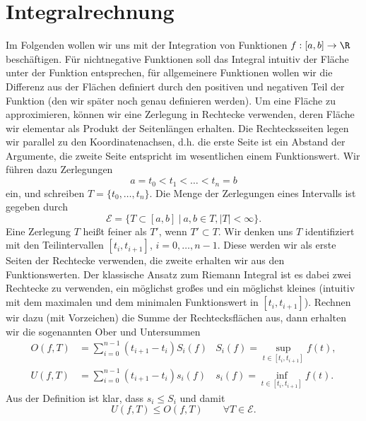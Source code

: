 \documentclass[letterpaper,10pt,english]{jupyterBook}
\begin{document}
\chapter{Integralrechnung}
\label{\detokenize{integration/integration:integralrechnung}}\label{\detokenize{integration/integration::doc}}
Im Folgenden wollen wir uns mit der Integration von Funktionen \(f:[a,b] \rightarrow \R\) beschäftigen. Für nichtnegative Funktionen soll das Integral intuitiv der Fläche unter der Funktion entsprechen, für allgemeinere Funktionen wollen wir die Differenz aus der Flächen definiert durch den positiven und negativen Teil der Funktion (den wir später noch genau definieren werden).  Um eine Fläche zu approximieren, können wir eine Zerlegung in Rechtecke verwenden, deren Fläche wir elementar als Produkt der Seitenlängen erhalten. Die Rechtecksseiten legen wir parallel zu den Koordinatenachsen, d.h. die erste Seite ist ein Abstand der Argumente, die zweite Seite entspricht im wesentlichen einem Funktionswert.
Wir führen dazu Zerlegungen
\begin{equation*}
 a = t_0 < t_1 < \ldots < t_n = b
\end{equation*}
ein, und schreiben \(T=\{t_0,\ldots,t_n\}\). Die Menge der Zerlegungen eines Intervalls ist gegeben durch
\begin{equation*}
 {\mathcal E} = \{ T \subset [a,b]~|~ a,b \in T, \vert T \vert < \infty\}.
\end{equation*}
Eine Zerlegung \(T\) heißt feiner als \(T'\), wenn \(T' \subset T\). Wir denken uns \(T\) identifiziert mit den Teilintervallen \([t_i,t_{i+1}]\), \(i=0,\ldots,n-1\). Diese werden wir als erste Seiten der Rechtecke verwenden, die zweite erhalten wir aus den Funktionswerten. Der klassische Ansatz zum Riemann Integral ist es dabei zwei Rechtecke zu verwenden, ein möglichst großes und ein möglichst kleines (intuitiv mit dem maximalen und dem minimalen Funktionswert in \([t_i,t_{i+1}]\)). Rechnen wir dazu (mit Vorzeichen) die Summe der Rechtecksflächen aus, dann erhalten wir die sogenannten Ober  und Untersummen
\begin{align*}
O(f,T) &= \sum_{i=0}^{n-1} (t_{i+1} - t_i) S_i(f) &S_i(f) =  \sup_{t \in  [t_i,t_{i+1}]} f(t), \\
U(f,T) &= \sum_{i=0}^{n-1} (t_{i+1} - t_i) s_i(f) &s_i(f) =  \inf_{t \in  [t_i,t_{i+1}]} f(t).
\end{align*}
Aus der Definition ist klar, dass \(s_i \leq S_i\) und damit
\begin{equation*}
 U(f,T) \leq O(f,T) \qquad \forall T \in {\mathcal E}.
\end{equation*}
\end{document}
